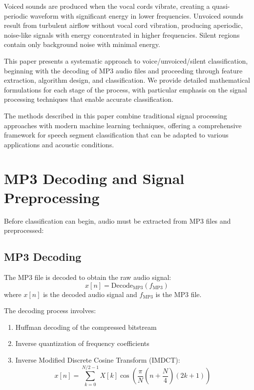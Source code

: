 \documentclass[10pt,journal,compsoc]{IEEEtran}
\begin{document}
Voiced sounds are produced when the vocal cords vibrate, creating a quasi-periodic waveform with significant energy in lower frequencies. Unvoiced sounds result from turbulent airflow without vocal cord vibration, producing aperiodic, noise-like signals with energy concentrated in higher frequencies. Silent regions contain only background noise with minimal energy.

This paper presents a systematic approach to voice/unvoiced/silent classification, beginning with the decoding of MP3 audio files and proceeding through feature extraction, algorithm design, and classification. We provide detailed mathematical formulations for each stage of the process, with particular emphasis on the signal processing techniques that enable accurate classification.

The methods described in this paper combine traditional signal processing approaches with modern machine learning techniques, offering a comprehensive framework for speech segment classification that can be adapted to various applications and acoustic conditions.

\section{MP3 Decoding and Signal Preprocessing}
Before classification can begin, audio must be extracted from MP3 files and preprocessed:

\subsection{MP3 Decoding}
The MP3 file is decoded to obtain the raw audio signal:
\begin{equation}
x[n] = \text{Decode}_{\text{MP3}}(f_{\text{MP3}})
\end{equation}
where $x[n]$ is the decoded audio signal and $f_{\text{MP3}}$ is the MP3 file.

The decoding process involves:
\begin{enumerate}
    \item Huffman decoding of the compressed bitstream
    \item Inverse quantization of frequency coefficients
    \item Inverse Modified Discrete Cosine Transform (IMDCT):
    \begin{equation}
    x[n] = \sum_{k=0}^{N/2-1} X[k] \cos\left(\frac{\pi}{N}(n+\frac{N}{4})(2k+1)\right)
    \end{equation}
\end{enumerate}
\end{document}
